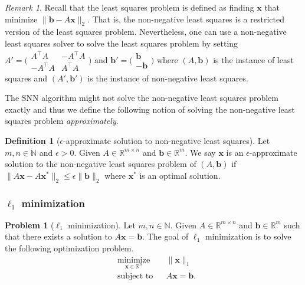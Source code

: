 \documentclass[11pt]{article}
\theoremstyle{remark}
\newtheorem{remark}{Remark}
\theoremstyle{definition}
\newtheorem{definition}{Definition}
\newtheorem{problem}{Problem}
\newcommand{\bx}{\mathbf{x}}
\newcommand{\bb}{\mathbf{b}}
\newcommand{\R}{{\mathbb R}} %
\newcommand{\N}{{\mathbb{N}}} %
\begin{document}
\begin{remark}
	Recall that the least squares problem is defined as finding $\bx$ that minimize $\|\bb-A\bx\|_2$. That is, the non-negative least squares is a restricted version of the least squares problem. Nevertheless, one can use a non-negative least squares solver to solve the least squares problem by setting $A'=\bigl( \begin{smallmatrix}A^\top A & -A^\top A \\ -A^\top A & A^\top A\end{smallmatrix}\bigr)$ and $\bb'=\bigl( \begin{smallmatrix} \bb \\ -\bb\end{smallmatrix}\bigr)$ where $(A,\bb)$ is the instance of least squares and $(A',\bb')$ is the instance of non-negative least squares.
\end{remark}

The SNN algorithm might not solve the non-negative least squares problem exactly and thus we define the following notion of solving the non-negative least squares problem \textit{approximately}.

\begin{definition}[$\epsilon$-approximate solution to non-negative least squares]\label{def:non-negative least squares eps approx sol}
	Let $m,n\in\N$ and $\epsilon>0$. Given $A\in\R^{m\times n}$ and $\bb\in\R^m$. We say $\bx$ is an $\epsilon$-approximate solution to the non-negative least squares problem of $(A,\bb)$ if $\|A\bx-A\bx^*\|_2\leq\epsilon\|\bb\|_2$ where $\bx^*$ is an optimal solution.
\end{definition}

\subsubsection{$\ell_1$ minimization}
\begin{problem}[$\ell_1$ minimization]\label{prob:l1min}
	Let $m,n\in\N$. Given $A\in\R^{m\times n}$ and $\bb\in\R^m$ such that there exists a solution to $A\bx=\bb$. The goal of $\ell_1$ minimization is to solve the following optimization problem.
	\begin{equation*}
	\begin{aligned}
	& \underset{\bx\in\R^n}{\text{minimize}}
	& & \|\bx\|_1 \\
	& \text{subject to}
	& & A\bx=\bb.
	\end{aligned}
	\end{equation*}
\end{problem}
\end{document}
